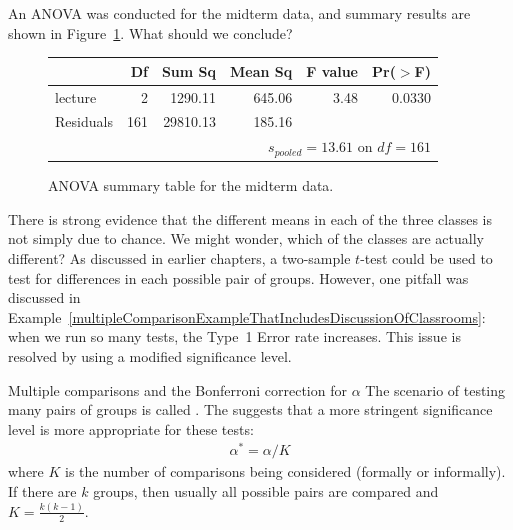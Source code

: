 \begin{exercisewrap}
\begin{nexercise} \label{exerExaminingAnovaSummaryTableForMidtermData}
An ANOVA was conducted for the midterm data, and summary results are shown in Figure~\ref{anovaSummaryTableForMidtermData}. What should we conclude?\footnotemark{}
\end{nexercise}
\end{exercisewrap}

\begin{figure}
\centering
\begin{tabular}{lrrrrr}
  \hline
 & Df & Sum Sq & Mean Sq & F value & Pr($>$F) \\ 
  \hline
lecture & 2 & 1290.11 & 645.06 & 3.48 & 0.0330 \\ 
  Residuals & 161 & 29810.13 & 185.16 &  &  \\ 
   \hline
\multicolumn{6}{r}{$s_{pooled}=13.61$ on $df=161$}
\end{tabular}
\caption{ANOVA summary table for the midterm data.}
\label{anovaSummaryTableForMidtermData}
\end{figure}

There is strong evidence that the different means in each of the three classes is not simply due to chance. We might wonder, which of the classes are actually different? As discussed in earlier chapters, a two-sample $t$-test could be used to test for differences in each possible pair of groups. However, one pitfall was discussed in Example~\vref{multipleComparisonExampleThatIncludesDiscussionOfClassrooms}: when we run so many tests, the Type~1 Error rate increases. This issue is resolved by using a modified significance level.

\begin{onebox}{Multiple comparisons and the Bonferroni correction for $\alpha$}
The scenario of testing many pairs of groups is called . The  suggests that a more stringent significance level is more appropriate for these tests:
\begin{align*}
\alpha^* = \alpha / K
\end{align*}
where $K$ is the number of comparisons being considered (formally or informally). If there are $k$ groups, then usually all possible pairs are compared and $K=\frac{k(k-1)}{2}$.
\end{onebox}

